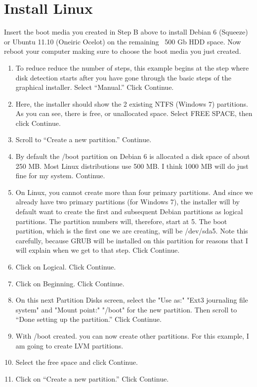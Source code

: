 \documentclass[12pt,notitlepage,onecolumn,oneside,openany,draft]{memoir}
\begin{document}
\chapter{Install Linux}
\newline
Insert the boot media you created in Step B above to install Debian 6 (Squeeze) or Ubuntu 11.10 (Oneiric Ocelot) on the remaining ~500 Gb HDD space.  Now reboot your computer making sure to choose the boot media you just created.
\newline
\begin{enumerate}
\item To reduce reduce the number of steps, this example begins at the step where disk detection starts after you have gone through the basic steps of the graphical installer. 
Select “Manual.”  Click Continue. 
\item Here, the installer should show the 2 existing NTFS (Windows 7) partitions. As you can see, there is free, or unallocated space. Select FREE SPACE, then click Continue. 
\item Scroll to “Create a new partition.” Continue. 
\item By default the /boot partition on Debian 6 is allocated a disk space of about 250 MB. Most Linux distributions use 500 MB. I think 1000 MB will do just fine for my system. Continue. 
\item On Linux, you cannot create more than four primary partitions. And since we already have two primary partitions (for Windows 7), the installer will by default want to create the first and subsequent Debian partitions as logical partitions. The partition numbers will, therefore, start at 5. The boot partition, which is the first one we are creating, will be /dev/sda5. Note this carefully, because GRUB will be installed on this partition for reasons that I will explain when we get to that step. Click Continue. 
\item Click on Logical. Click Continue. 
\item Click on Beginning. Click Continue. 
\item On this next Partition Disks screen, select the "Use as:" "Ext3 journaling file system" and "Mount point:" "/boot" for the new partition. Then scroll to “Done setting up the partition.” Click Continue. 
\item With /boot created. you can now create other partitions. For this example, I am going to create LVM partitions. 
\item Select the free space and click Continue. 
\item Click on “Create a new partition.” Click Continue. 

\end{enumerate}
\end{document}
